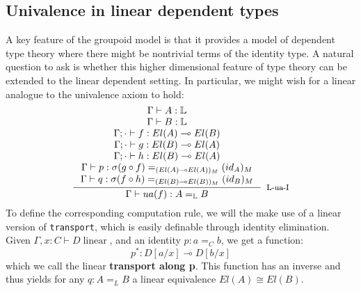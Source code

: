 \documentclass[a4paper,english]{lipics-v2018}
\DeclareMathOperator{\linear}{\text{ linear}}
\begin{document}
\subsection{Univalence in linear dependent types}\label{highermodel}
A key feature of the groupoid model is that it provides a model of dependent type theory where there might be nontrivial terms of the identity type. A natural question to ask is whether this higher dimensional feature of type theory can be extended to the linear dependent setting.
In particular, we might wish for a linear analogue to the univalence axiom to hold:
\[
  \inference{
    \Gamma \vdash A : \mathbb{L}\\
    \Gamma \vdash B : \mathbb{L}\\
    \Gamma; \cdot \vdash f : El(A) \multimap El(B)\\
    \Gamma; \cdot \vdash g : El(B) \multimap El(A)\\
    \Gamma; \cdot \vdash h : El(B) \multimap El(A)\\
    \Gamma \vdash p : \sigma(g \circ f)  =_{(El(A) \multimap El(A))_M} (id_A)_M\\
    \Gamma \vdash q : \sigma(f \circ h) =_{(El(B) \multimap El(B))_M} (id_B)_M\\
    }{\Gamma \vdash ua(f) : A =_{\mathbb{L}} B}[L-ua-I]
  \]
  To define the corresponding computation rule, we will the make use of a linear version of \texttt{transport}, which is easily definable through identity elimination. Given $\Gamma, x : C \vdash D \linear$, and an identity $p : a =_C b$, we get a function:
\[
  p^* : D[a/x] \multimap D[b/x]
  \]
  which we call the linear \textbf{transport along p}.
  This function has an inverse and thus yields for any $q : A =_L B$ a linear equivalence $El(A) \cong El(B)$.
  
\end{document}
